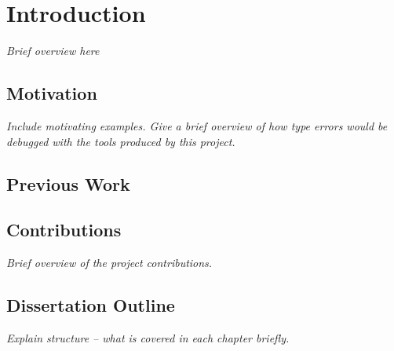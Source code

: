 \chapter{Introduction}
\textit{Brief overview here}

\section{Motivation}
\textit{Include motivating examples. Give a brief overview of how type errors would be debugged with the tools produced by this project.}


\section{Previous Work}


\section{Contributions}
\textit{Brief overview of the project contributions.}

\section{Dissertation Outline}
\textit{Explain structure -- what is covered in each chapter briefly.}